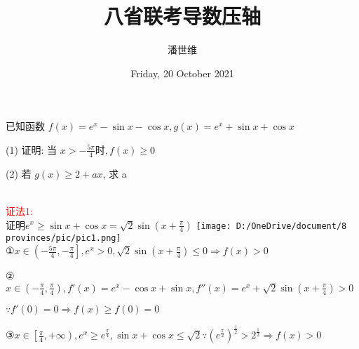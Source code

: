 \documentclass[a4paper,12pt]{article}
\begin{document}
\title {八省联考导数压轴}
\author{潘世维}
\date{Friday, 20 October 2021}
\maketitle

已知函数 $ f(x)=e^{x}-\sin x-\cos x, g(x)=e^{x}+\sin x+\cos x$


(1) 证明: 当 $ x>-\frac{5 \pi}{4}  时,  f(x) \geq 0 $



(2) 若 $ g(x) \geq 2+a x $, 求  a 
\begin{flushleft}
~\\
\textcolor{red}{证法1:}\\
证明$e^x \ge \sin x + \cos x = \sqrt 2 \sin \left( x + \frac{\pi }{4} \right) $
\texttt{[image: D:/OneDrive/document/8 provinces/pic/pic1.png]}\\
①$x \in \left( { - \frac{{5\pi }}{4}, - \frac{\pi }{4}} \right],{e^x} > 0,\sqrt 2 \sin \left( {x + \frac{\pi }{4}} \right) \le 0 \Rightarrow f(x) > 0$

②$x \in \left( { - \frac{\pi }{4},\frac{\pi }{4}} \right),f'(x) = {e^x} - \cos x + \sin x,f''(x) = {e^x} + \sqrt 2 \sin \left( {x + \frac{\pi }{4}} \right) > 0$

$ \because f'(0) = 0 \Rightarrow f(x) \ge f(0) = 0$

③$\left. {x \in \left[ {\frac{\pi }{4}, + \infty } \right.} \right),{e^x} \ge {e^{\frac{\pi }{4}}},\sin x + \cos x \le \sqrt 2 \because {\left( {{e^{\frac{\pi }{2}}}} \right)^{\frac{1}{2}}} > {2^{\frac{1}{2}}} \Rightarrow f(x) > 0$

\end{flushleft}
\end{document}

